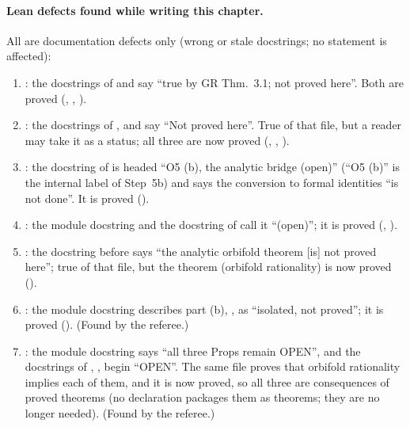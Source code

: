 \paragraph{Lean defects found while writing this chapter.} All are documentation defects only (wrong or stale
docstrings; no statement is affected):
\begin{enumerate}
\item {}: the docstrings of
   and  say ``true by GR Thm.~3.1; not proved here''. Both are
  proved (, , ).
\item {}: the docstrings of
  ,  and  say ``Not proved
  here''. True of that file, but a reader may take it as a status; all three are now proved
  (, , ).
\item {}: the docstring of
   is headed ``O5 (b), the analytic bridge (open)'' (``O5 (b)'' is the internal label of Step~5b) and says the conversion to formal identities
  ``is not done''. It is proved ().
\item {}: the module docstring and the
  docstring of  call it ``(open)''; it is proved (,
  ).
\item {}: the docstring
  before  says ``the analytic orbifold theorem [is] not proved here''; true of that
  file, but the theorem (orbifold rationality) is now proved ().
\item {}: the module docstring
  describes part (b), , as ``isolated, not proved''; it is proved
  (). (Found by the referee.)
\item {}: the module docstring
  says ``all three Props remain OPEN'', and the docstrings of ,
  ,  begin ``OPEN''. The same file proves
  that orbifold rationality implies each of them, and it is now proved, so all three are consequences of proved theorems (no declaration
  packages them as theorems; they are no longer needed). (Found by the referee.)
\end{enumerate}

